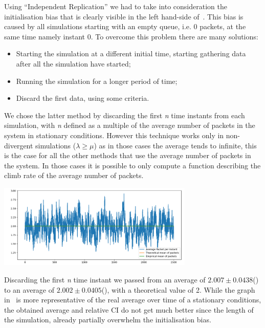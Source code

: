 \documentclass[10pt,a4paper]{article}
\begin{document}
Using ``Independent Replication'' we had to take into consideration the initialisation bias that is clearly visible in the left hand-side of~. This bias is caused by all simulations starting with an empty queue, i.e. 0 packets, at the same time namely instant 0. To overcome this problem there are many solutions:
\begin{itemize}
\item Starting the simulation at a different initial time, starting gathering data after all the simulation have started;
\item Running the simulation for a longer period of time;
\item Discard the first data, using some criteria.
\end{itemize}

We chose the latter method by discarding the first \emph{n} time instants from each simulation, with \emph{n} defined as a multiple of the average number of packets in the system in stationary conditions. However this technique works only in non-divergent simulations (\(\lambda\geq\mu\)) as in those cases the average tends to infinite, this is the case for all the other methods that use the average number of packets in the system. In those cases it is possible to only compute a function describing the climb rate of the average number of packets.

\begin{center}
  \includegraphics[width=0.7\textwidth]{independent-replication-without-bias.png}
  \label{fig:independent-replication-without-bias}
\end{center}

Discarding the first \emph{n} time instant we passed from an average of \(2.007 \pm 0.0438\)() to an average of \(2.002 \pm 0.0405\)(), with a theoretical value of 2. While the graph in~ is more representative of the real average over time of a stationary conditions, the obtained average and relative CI do not get much better since the length of the simulation, already partially overwhelm the initialisation bias.
\end{document}
